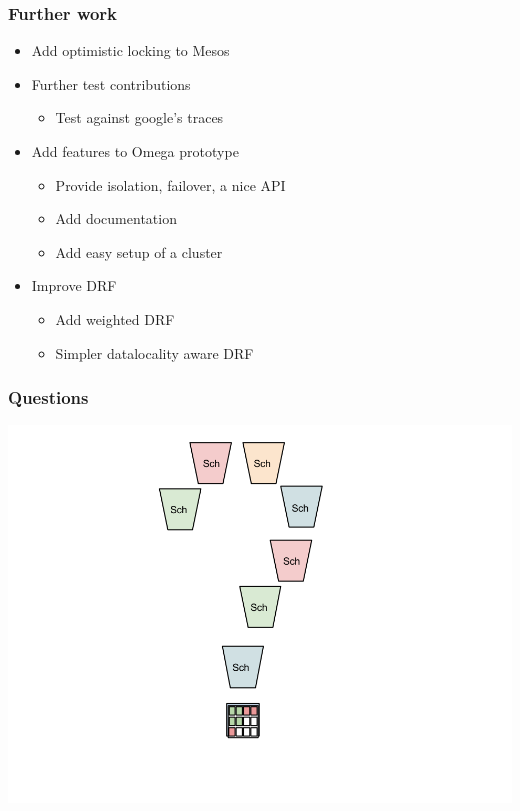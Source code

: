 \documentclass[notes=hide]{beamer}
\begin{document}
  \begin{frame}
    \frametitle{Further work}
    \begin{itemize}
      \item Add optimistic locking to Mesos
      \item Further test contributions 
      \begin{itemize}
        \item Test against google's traces
       \end{itemize}
      \item Add features to Omega prototype
      \begin{itemize}
        \item Provide isolation, failover, a nice API
        \item Add documentation
        \item Add easy setup of a cluster
       \end{itemize}
      \item Improve DRF
      \begin{itemize}
        \item Add weighted DRF
        \item Simpler datalocality aware DRF
       \end{itemize}

    \end{itemize}
  \end{frame}

  \note{

  }

  \begin{frame}
    \frametitle{Questions}
    \includegraphics[trim = 0mm 0mm 25mm 0mm,clip,scale=0.35,natwidth=960,natheight=720]{Question.png}
  \end{frame}
\end{document}
